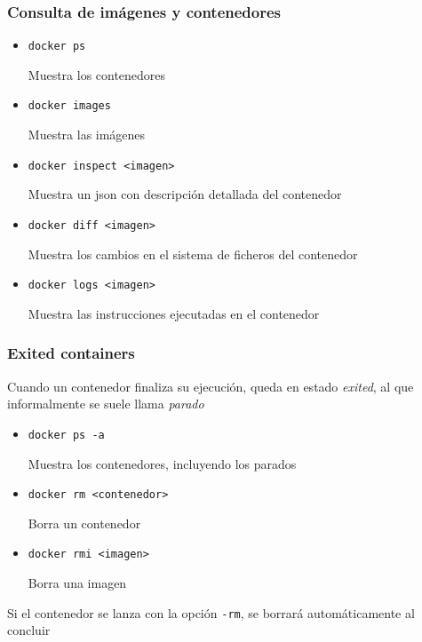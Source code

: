 \documentclass[ucs]{beamer}
\begin{document}
\begin{frame}[fragile]
\frametitle{Consulta de imágenes y contenedores}
\begin{itemize}
\item
\verb|docker ps|

Muestra los contenedores

\item
\verb|docker images|

Muestra las imágenes

\item
\verb|docker inspect <imagen>|

Muestra un json con descripción detallada del contenedor

\item
\verb|docker diff <imagen>|

Muestra los cambios en el sistema de ficheros del contenedor

\item
\verb|docker logs <imagen>|

Muestra las instrucciones ejecutadas en el contenedor


\end{itemize}

\end{frame}


\begin{frame}[fragile]
\frametitle{Exited containers}
Cuando un contenedor finaliza su ejecución, queda en estado 
\emph{exited}, al que informalmente se suele llama
\emph{parado}

\begin{itemize}
\item
\verb|docker ps -a|

Muestra los contenedores, incluyendo los parados

%

\item
\verb|docker rm <contenedor>|

Borra un contenedor


\item
\verb|docker rmi <imagen>|

Borra una imagen


\end{itemize}

Si el contenedor se lanza con la opción
\verb|-rm|, se borrará automáticamente al concluir

\end{frame}
\end{document}
